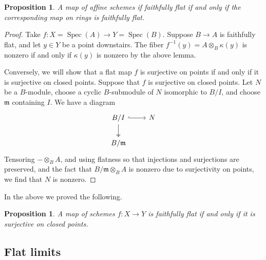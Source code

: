 \documentclass[10pt]{article}
\newtheorem{prop}[thm]{Proposition}
\theoremstyle{definition}
\DeclareMathOperator{\Spec}{Spec}
\newcommand{\mf}{\mathfrak}
\begin{document}
\begin{prop}
A map of affine schemes if faithfully flat if and only if the corresponding map on rings is faithfully flat.
\end{prop}
\begin{proof}
Take $f: X = \Spec(A) \rightarrow Y = \Spec(B)$.  Suppose $B \rightarrow A$ is faithfully flat, and let $y \in Y$ be a point downstairs.  The fiber $f^{-1}(y) = A \otimes_B \kappa(y)$ is nonzero if and only if $\kappa(y)$ is nonzero by the above lemma.  

Conversely, we will show that a flat map $f$ is surjective on points if and only if it is surjective on closed points.  Suppose that $f$ is surjective on closed points.  Let $N$ be a $B$-module, choose a cyclic $B$-submodule of $N$ isomorphic to $B/I$, and choose $\mf{m}$ containing $I$.  We have a diagram
$$\begin{tikzcd}
B/I \arrow[r, hook] \arrow[d, two heads] & N \\
B/\mf{m}
\end{tikzcd}$$
Tensoring $- \otimes_B A$, and using flatness so that injections and surjections are preserved, and the fact that $B/\mf{m} \otimes_B A$ is nonzero due to surjectivity on points, we find that $N$ is nonzero.
\end{proof}

In the above we proved the following.
\begin{prop}
A map of schemes $f: X \rightarrow Y$ is faithfully flat if and only if it is surjective on closed points.
\end{prop}


\subsection{Flat limits}
\end{document}
